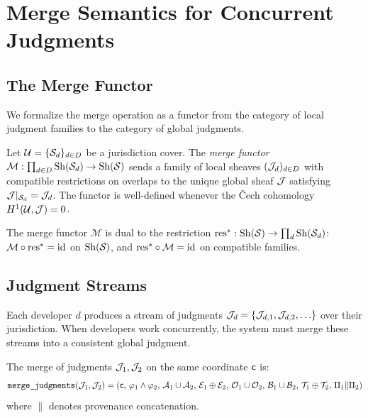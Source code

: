 \documentclass[11pt]{article}
\newcommand{\MergeOp}{\texttt{merge\_judgments}}
\newcommand{\Sh}{\mathrm{Sh}}
\newcommand{\id}{\mathrm{id}}
\newcommand{\MergeFun}{\mathcal{M}}
\begin{document}
\section{Merge Semantics for Concurrent Judgments}\label{sec:merge}

\subsection{The Merge Functor}

We formalize the merge operation as a functor from the category of local
judgment families to the category of global judgments.

\begin{definition}
Let $\mathcal{U} = \{\mathcal{S}_d\}_{d \in D}$ be a jurisdiction cover. The
\emph{merge functor} $\MergeFun : \prod_{d \in D} \Sh(\Site_d) \to \Sh(\Site)$
sends a family of local sheaves $(\mathcal{J}_d)_{d \in D}$ with compatible restrictions
on overlaps to the unique global sheaf $\mathcal{J}$ satisfying $\mathcal{J}|_{\mathcal{S}_d} = \mathcal{J}_d$.
The functor is well-defined whenever the \v{C}ech cohomology
$H^{1}(\mathcal{U}, \mathcal{J}) = 0$.
\end{definition}

The merge functor $\MergeFun$ is dual to the restriction
$\res^* : \Sh(\Site) \to \prod_d \Sh(\Site_d)$: $\MergeFun \circ \res^* = \id$
on $\Sh(\Site)$, and $\res^* \circ \MergeFun = \id$ on compatible families.

\subsection{Judgment Streams}

Each developer $d$ produces a stream of judgments
$\mathcal{J}_d = \{\mathcal{J}_{d,1}, \mathcal{J}_{d,2}, \ldots\}$ over their jurisdiction.
When developers work concurrently, the system must merge these streams into a
consistent global judgment.

\begin{definition}
The merge of judgments $\mathcal{J}_1, \mathcal{J}_2$ on the same coordinate $\mathsf{c}$ is:
\[
  \MergeOp(\J_1, \J_2) = \Jud{\coord}
    {\prop_1 \wedge \prop_2}
    {\carrier_1 \cup \carrier_2}
    {\evid_1 \tjoin \evid_2}
    {\oblig_1 \cup \oblig_2}
    {\obstr_1 \cup \obstr_2}
    {\trust_1 \tjoin \trust_2}
    {\prov_1 \| \prov_2}
\]
where $\|$ denotes provenance concatenation.
\end{definition}
\end{document}
